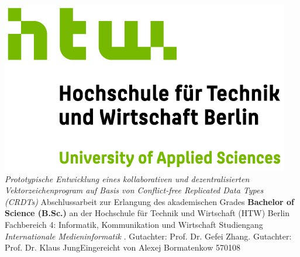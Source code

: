 \documentclass[oneside,bibliography=totocnumbered,BCOR=5mm]{scrbook}
\begin{document}
\begin{titlepage}
\begin{center}
\includegraphics{HTW_Berlin_Logo_farbig.jpg}
\linebreak[4]
\linebreak[4]
\linebreak[4]
\linebreak[4]
\textit{\large Prototypische Entwicklung eines kollaborativen und dezentralisierten Vektorzeichenprogram auf Basis von Conflict-free Replicated Data Types (CRDTs)}
\linebreak[4]
\linebreak[4]
\linebreak[4]
Abschlussarbeit 
\linebreak[4]
\linebreak[4]
zur Erlangung des akademischen Grades 
\linebreak[4]
\linebreak[4]
\textbf{Bachelor of Science (B.Sc.)}
\linebreak[4]
\linebreak[4]
an der
\linebreak[4]
\linebreak[4]
Hochschule für Technik und Wirtschaft (HTW) Berlin
\linebreak[4]
Fachbereich 4: Informatik, Kommunikation und Wirtschaft
\linebreak[4]
Studiengang \textit{Internationale Medieninformatik}
\linebreak[4]
\linebreak[4]
. Gutachter: Prof. Dr. Gefei Zhang. Gutachter: Prof. Dr. Klaus Jung\linebreak[4]
\linebreak[4]
\linebreak[4]
\linebreak[4]
\linebreak[4]
Eingereicht von Alexej Bormatenkow 570108
\linebreak[4]
\linebreak[4]
\linebreak[4]
\linebreak[4]
\date{\today}


\end{center}
\end{titlepage}
\newpage
\thispagestyle{empty}
\newpage
\thispagestyle{empty}       %
\end{document}
